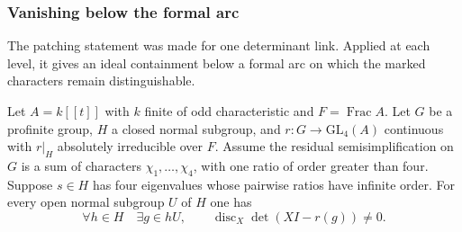 


\subsubsection{Vanishing below the formal arc}\label{par:count-two-arc}

The patching statement was made for one determinant link. Applied at each level, it gives an ideal containment below a formal arc on which the marked characters remain distinguishable.

\begin{auxlemma}
\label{lem:ordinary-four-regular-cosets}
Let \(A=k[[t]]\) with \(k\) finite of odd characteristic and
\(F=\operatorname{Frac}A\). Let \(G\) be a profinite group,
\(H\) a closed normal subgroup, and
\(r:G\to\mathrm{GL}_4(A)\) continuous with \(r|_H\) absolutely
irreducible over \(F\). Assume the residual semisimplification
on \(G\) is a sum of characters \(\chi_1,\ldots,\chi_4\), with
one ratio of order greater than four. Suppose \(s\in H\) has four
eigenvalues whose pairwise ratios have infinite order. For every
open normal subgroup \(U\) of \(H\) one has
\[
  \forall h\in H\quad\exists g\in hU,\qquad
               \operatorname{disc}_X\det(XI-r(g))\ne0 .
\]
\end{auxlemma}
